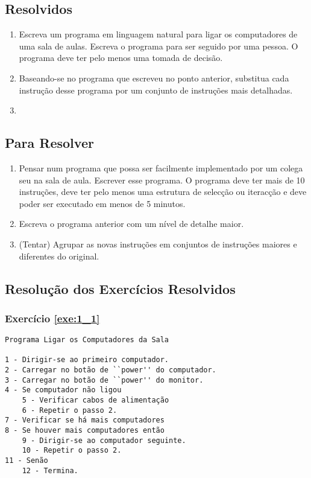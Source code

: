 \subsection{Resolvidos}

\begin{enumerate}
	\item \label{exe:1_1} Escreva um programa em linguagem natural para ligar os computadores de uma sala de aulas. Escreva o programa para ser seguido por uma pessoa. O programa deve ter pelo menos uma tomada de decisão.
	
	\item \label{exe:1_2} Baseando-se no programa que escreveu no ponto anterior, substitua cada instrução desse programa por um conjunto de instruções mais detalhadas.
	
	\item \label{exe:1_3} 
\end{enumerate}

\subsection{Para Resolver}
\begin{enumerate}
\item 
Pensar num programa que possa ser facilmente implementado por um colega seu na sala de aula. Escrever esse programa.  O programa deve ter mais de 10 instruções, deve ter pelo menos uma estrutura de selecção ou iteracção e deve poder ser executado em menos de 5 minutos.

\item Escreva o programa anterior com um nível de detalhe maior.

\item (Tentar) Agrupar as novas instruções em conjuntos de instruções maiores e diferentes do original.
\end{enumerate}

\subsection{Resolução dos Exercícios Resolvidos}

{\footnotesize
\subsubsection*{Exercício \ref{exe:1_1}}
\begin{verbatim}
Programa Ligar os Computadores da Sala

1 - Dirigir-se ao primeiro computador.
2 - Carregar no botão de ``power'' do computador.
3 - Carregar no botão de ``power'' do monitor.
4 - Se computador não ligou
    5 - Verificar cabos de alimentação
    6 - Repetir o passo 2.
7 - Verificar se há mais computadores     
8 - Se houver mais computadores então
    9 - Dirigir-se ao computador seguinte.
    10 - Repetir o passo 2.
11 - Senão
    12 - Termina.    
\end{verbatim}}
